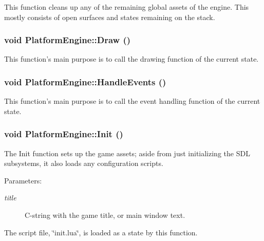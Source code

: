This function cleans up any of the remaining global assets of the engine. This mostly consists of open surfaces and states remaining on the stack. \hypertarget{class_platform_engine_cd756d58f81c5e28efe98ae075367a5c}{
\subsubsection[{Draw}]{\setlength{\rightskip}{0pt plus 5cm}void PlatformEngine::Draw ()}}
\label{class_platform_engine_cd756d58f81c5e28efe98ae075367a5c}


This function's main purpose is to call the drawing function of the current state. \hypertarget{class_platform_engine_7fc47bff353292f1a1435d78664df36d}{
\subsubsection[{HandleEvents}]{\setlength{\rightskip}{0pt plus 5cm}void PlatformEngine::HandleEvents ()}}
\label{class_platform_engine_7fc47bff353292f1a1435d78664df36d}


This function's main purpose is to call the event handling function of the current state. \hypertarget{class_platform_engine_059814bb3f1815b15d5a892f8ea6cb4a}{
\subsubsection[{Init}]{\setlength{\rightskip}{0pt plus 5cm}void PlatformEngine::Init ()}}
\label{class_platform_engine_059814bb3f1815b15d5a892f8ea6cb4a}


The Init function sets up the game assets; aside from just initializing the SDL subsystems, it also loads any configuration scripts.

\begin{Desc}
\item[Parameters:]
\begin{description}
\item[{\em title}]C-string with the game title, or main window text. \end{description}
\end{Desc}


The script file, \char`\"{}init.lua\char`\"{}, is loaded as a state by this function.


